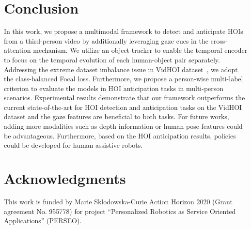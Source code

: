 \documentclass[times,twocolumn,final,authoryear]{elsarticle}
\begin{document}
\section{Conclusion}
In this work, we propose a multimodal framework to detect and anticipate HOIs from a third-person video by additionally leveraging gaze cues in the cross-attention mechanism. We utilize an object tracker to enable the temporal encoder to focus on the temporal evolution of each human-object pair separately. Addressing the extreme dataset imbalance issue in VidHOI dataset~\citep{hoi_v_set:VidHOI}, we adopt the class-balanced Focal loss. Furthermore, we propose a person-wise multi-label criterion to evaluate the models in HOI anticipation tasks in multi-person scenarios. Experimental results demonstrate that our framework outperforms the current state-of-the-art for HOI detection and anticipation tasks on the VidHOI dataset and the gaze features are beneficial to both tasks. For future works, adding more modalities such as depth information or human pose features could be advantageous. Furthermore, based on the HOI anticipation results, policies could be developed for human-assistive robots. 

\section*{Acknowledgments}
This work is funded by Marie Sklodowska-Curie Action Horizon 2020 (Grant agreement No. 955778) for project ``Personalized Robotics as Service Oriented Applications'' (PERSEO).



\end{document}
